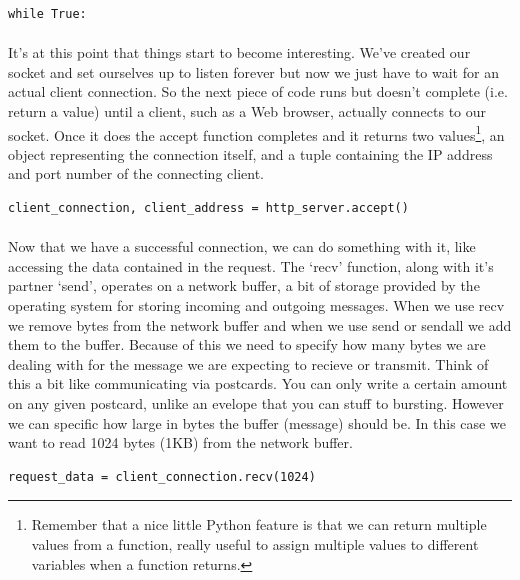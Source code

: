 \begin{lstlisting}[style=CODE]
while True:
\end{lstlisting}

\paragraph{} It's at this point that things start to become interesting. We've created our socket and set ourselves up to listen forever but now we just have to wait for an actual client connection. So the next piece of code runs but doesn't complete (i.e. return a value) until a client, such as a Web browser, actually connects to our socket. Once it does the accept function completes and it returns two values\footnote{Remember that a nice little Python feature is that we can return multiple values from a function, really useful to assign multiple values to different variables when a function returns.}, an object representing the connection itself, and a tuple containing the IP address and port number of the connecting client.

\begin{lstlisting}[style=CODE]
client_connection, client_address = http_server.accept()
\end{lstlisting}

\paragraph{} Now that we have a successful connection, we can do something with it, like accessing the data contained in the request. The `recv' function, along with it's partner `send', operates on a network buffer, a bit of storage provided by the operating system for storing incoming and outgoing messages. When we use recv we remove bytes from the network buffer and when we use send or sendall we add them to the buffer. Because of this we need to specify how many bytes we are dealing with for the message we are expecting to recieve or transmit. Think of this a bit like communicating via postcards. You can only write a certain amount on any given postcard, unlike an evelope that you can stuff to bursting. However we can specific how large in bytes the buffer (message) should be. In this case we want to read 1024 bytes (1KB) from the network buffer.

\begin{lstlisting}[style=CODE]
request_data = client_connection.recv(1024)
\end{lstlisting}

